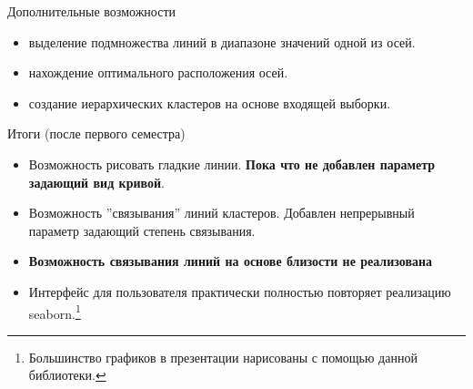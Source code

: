 \documentclass[fleqn, xcolor=x11names]{beamer}
\begin{document}
\begin{frame}{Дополнительные возможности}
    \begin{itemize}
        \item выделение подмножества линий в  диапазоне значений одной из осей.
        \item нахождение оптимального расположения осей.
        \item создание иерархических кластеров на основе входящей выборки.
    \end{itemize}
\end{frame}

\begin{frame}{Итоги (после первого семестра)}
    \begin{itemize}
        \item Возможность рисовать гладкие линии. \textbf{Пока что не добавлен параметр задающий вид кривой}.
        \item Возможность ''связывания'' линий кластеров.
              Добавлен непрерывный параметр задающий степень связывания.
        \item \textbf{Возможность связывания линий на основе близости не реализована}
        \item Интерфейс для пользователя практически полностью повторяет реализацию seaborn.\footnote{
                  Большинство графиков в презентации нарисованы с помощью данной библиотеки.}
    \end{itemize}
\end{frame}
\end{document}
